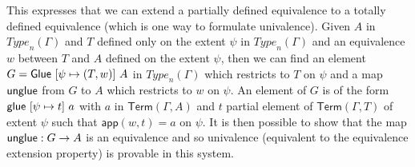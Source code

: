 \documentclass[10pt,a4paper]{article}
\def\Type{{Type}}
\newcommand{\app}{\mathsf{app}}
\newcommand{\Elem}{\mathsf{Term}}
\newcommand{\Glue}{{\sf Glue}}
\newcommand{\unglue}{{\sf unglue}}
\newcommand{\glue}{{\sf glue}}
\begin{document}
 This expresses that we can extend a partially defined equivalence to a totally defined
equivalence (which is one way
to formulate univalence). Given $A$ in $\Type_n(\Gamma)$ and $T$ defined only on the extent
$\psi$ in $\Type_n(\Gamma)$ and an equivalence $w$ between $T$ and $A$ defined on the extent
$\psi$, then we can find an element $G = \Glue~[\psi\mapsto (T,w)]~A$ in $\Type_n(\Gamma)$
which restricts to $T$ on $\psi$ and a map $\unglue$ from $G$ to $A$ which restricts
to $w$ on $\psi$. 
An element of $G$ is of the form $\glue~[\psi\mapsto t]~a$ with $a$ in $\Elem(\Gamma,A)$
and $t$ partial element of $\Elem(\Gamma,T)$ of extent $\psi$ such that $\app(w,t) = a$
on $\psi$. It is then possible to show that the map $\unglue:G\rightarrow A$ is an equivalence
and so univalence (equivalent to the equivalence extension property) is provable in this system.

\end{document}
